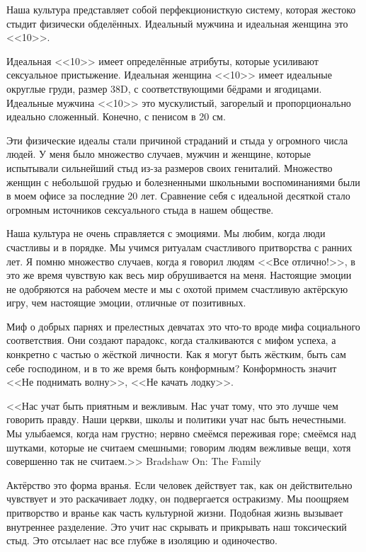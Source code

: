 \documentclass[10pt, fleqn]{article}
\begin{document}
Наша культура представляет собой перфекционисткую систему, которая жестоко стыдит физически обделённых. Идеальный мужчина и идеальная женщина это <<10>>.

Идеальная <<10>> имеет определённые атрибуты, которые усиливают сексуальное пристыжение. Идеальная женщина <<10>> имеет идеальные округлые груди, размер 38D, с соответствующими бёдрами и ягодицами. Идеальные мужчина <<10>> это мускулистый, загорелый и пропорционально идеально сложенный. Конечно, с пенисом в 20 см.

Эти физические идеалы стали причиной страданий и стыда у огромного числа людей. У меня было множество случаев, мужчин и женщине, которые испытывали сильнейший стыд из-за размеров своих гениталий. Множество женщин с небольшой грудью и болезненными школьными воспоминаниями были в моем офисе за последние 20 лет.
Сравнение себя с идеальной десяткой стало огромным источников сексуального стыда в нашем обществе.


Наша культура не очень справляется с эмоциями. Мы любим, когда люди счастливы и в порядке. Мы учимся ритуалам счастливого притворства с ранних лет. Я помню множество случаев, когда я говорил людям <<Все отлично!>>, в это же время чувствую как весь мир обрушивается на меня. Настоящие эмоции не одобряются на рабочем месте и мы с охотой примем счастливую актёрскую игру, чем настоящие эмоции, отличные от позитивных.


Миф о добрых парнях и прелестных девчатах это что-то вроде мифа социального соответствия. Они создают парадокс, когда сталкиваются с мифом успеха, а конкретно с частью о жёсткой личности. Как я могут быть жёстким, быть сам себе господином, и в то же время быть конформным? Конформность значит <<Не поднимать волну>>, <<Не качать лодку>>.

<<Нас учат быть приятным и вежливым. Нас учат тому, что это лучше чем говорить правду. Наши церкви, школы и политики учат нас быть нечестными. Мы улыбаемся, когда нам грустно; нервно смеёмся переживая горе; смеёмся над шутками, которые не считаем смешными; говорим людям вежливые вещи, хотя совершенно так не считаем.>> Bradshaw On: The Family

Актёрство это форма вранья. Если человек действует так, как он действительно чувствует и это раскачивает лодку, он подвергается остракизму. Мы поощряем притворство и вранье как часть культурной жизни. Подобная жизнь вызывает внутреннее разделение. Это учит нас скрывать и прикрывать наш токсический стыд. Это отсылает нас все глубже в изоляцию и одиночество.
\end{document}
